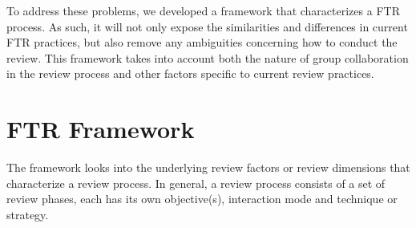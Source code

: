 To address these problems, we developed a framework that
characterizes a FTR process. As such, it will not only expose the
similarities and differences in current FTR practices, but also remove
any ambiguities concerning how to conduct the review. This framework
takes into account both the nature of group collaboration in the
review process and other factors specific to current review practices. 


\section {FTR Framework}

The framework looks into the underlying review factors or review
dimensions that characterize a review process. In general, a review
process consists of a set of review phases, each has its own
objective(s), interaction mode and technique or strategy.

